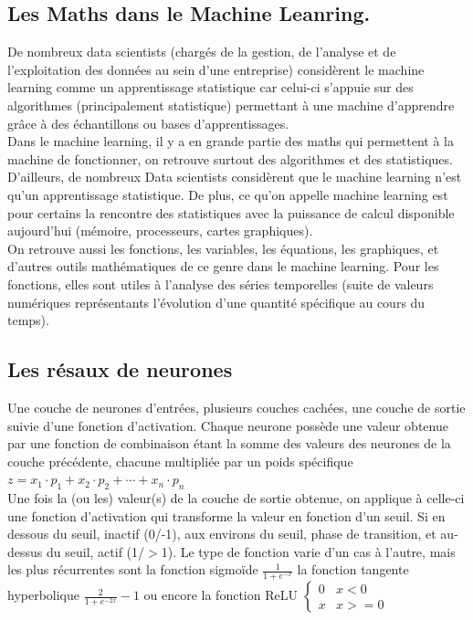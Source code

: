 \documentclass[a4paper, 12pt]{article}
\numberwithin{equation}{subsection}
\begin{document}
\subsection{Les Maths dans le Machine Leanring.}
De nombreux data scientists (chargés de la gestion, de l’analyse et de l’exploitation des données au sein d’une entreprise) considèrent le machine learning comme un apprentissage statistique car celui-ci s’appuie sur des algorithmes (principalement statistique) permettant à une machine d'apprendre grâce à des échantillons ou bases d’apprentissages.\\

Dans le machine learning, il y a en grande partie des maths qui permettent à la machine de fonctionner, on retrouve surtout des algorithmes et des statistiques. D’ailleurs, de nombreux Data scientists considèrent que le machine learning n’est qu’un apprentissage statistique. De plus, ce qu’on appelle machine learning est pour certains la rencontre des statistiques avec la puissance de calcul disponible aujourd’hui (mémoire, processeurs, cartes graphiques).\\

On retrouve aussi les fonctions, les variables, les équations, les graphiques, et d’autres outils mathématiques de ce genre dans le machine learning.  Pour les fonctions, elles sont utiles à l’analyse des séries temporelles (suite de valeurs numériques représentants l’évolution d’une quantité spécifique au cours du temps).\\[1.0cm]
\subsection{Les résaux de neurones}
Une couche de neurones d’entrées, plusieurs couches cachées, une couche de sortie suivie d’une fonction d’activation.
Chaque neurone possède une valeur obtenue par une fonction de combinaison étant la somme des valeurs des neurones de la couche précédente, chacune multipliée par un poids spécifique
$ z = x_1 \cdot p_1 + x_2 \cdot p_2 + \cdots + x_n \cdot p_n $ \\

Une fois la (ou les) valeur(s) de la couche de sortie obtenue, on applique à celle-ci une fonction d’activation qui transforme la valeur en fonction d’un seuil. Si en dessous du seuil, inactif (0/-1), aux environs du seuil, phase de transition, et au-dessus du seuil, actif (1/$>$1). Le type de fonction varie d’un cas à l’autre, mais les plus récurrentes sont la fonction sigmoïde $ \frac{1}{1 + e^{-x}} $ la fonction tangente hyperbolique $ \frac{2} {1 + e^{-2x}} -1 $
ou encore la fonction ReLU $ \begin{cases} 0 & x < 0 \\ x & x >= 0 \end{cases} $ \\
\end{document}
